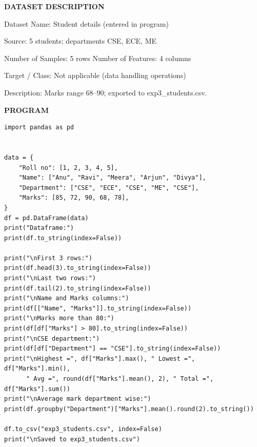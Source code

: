 \documentclass[11pt,twoside]{article}
\newcommand{\expheading}[1]{{\fontsize{14}{17}\selectfont\textbf{#1}\par}}
\begin{document}
{\expheading{DATASET DESCRIPTION}
\vspace{4pt}
\noindent Dataset Name: Student details (entered in program)\par
\noindent Source: 5 students; departments CSE, ECE, ME\par
\noindent Number of Samples: 5 rows \hspace{0.3cm} Number of Features: 4 columns\par
\noindent Target / Class: Not applicable (data handling operations)\par
\noindent Description: Marks range 68--90; exported to exp3\_students.csv. \par
\vspace{4pt}
} %

\newpage
\expheading{PROGRAM}
\vspace{6pt}

\begin{lstlisting}
import pandas as pd


data = {
    "Roll no": [1, 2, 3, 4, 5],
    "Name": ["Anu", "Ravi", "Meera", "Arjun", "Divya"],
    "Department": ["CSE", "ECE", "CSE", "ME", "CSE"],
    "Marks": [85, 72, 90, 68, 78],
}
df = pd.DataFrame(data)
print("Dataframe:")
print(df.to_string(index=False))

print("\nFirst 3 rows:")
print(df.head(3).to_string(index=False))
print("\nLast two rows:")
print(df.tail(2).to_string(index=False))
print("\nName and Marks columns:")
print(df[["Name", "Marks"]].to_string(index=False))
print("\nMarks more than 80:")
print(df[df["Marks"] > 80].to_string(index=False))
print("\nCSE department:")
print(df[df["Department"] == "CSE"].to_string(index=False))
print("\nHighest =", df["Marks"].max(), " Lowest =", df["Marks"].min(),
      " Avg =", round(df["Marks"].mean(), 2), " Total =", df["Marks"].sum())
print("\nAverage mark department wise:")
print(df.groupby("Department")["Marks"].mean().round(2).to_string())

df.to_csv("exp3_students.csv", index=False)
print("\nSaved to exp3_students.csv")
\end{lstlisting}
\end{document}

